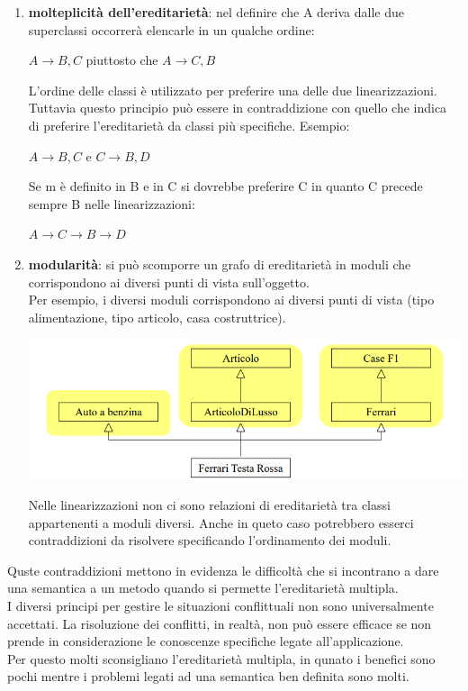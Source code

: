 \documentclass{article}
\begin{document}
	\begin{enumerate}
		\item \textbf{molteplicità dell'ereditarietà}: nel definire che A deriva dalle due superclassi occorrerà elencarle in un qualche ordine:
		\begin{center}
			$A \rightarrow B,C$ piuttosto che $A \rightarrow C,B$
		\end{center}
		L'ordine delle classi è utilizzato per preferire una delle due linearizzazioni. Tuttavia questo principio può essere in contraddizione con quello che indica di preferire l'ereditarietà da classi più specifiche. Esempio:
		\begin{center}
			$A \rightarrow B,C$ e $C \rightarrow B,D$
		\end{center}
		Se m è definito in B e in C si dovrebbe preferire C in quanto C precede sempre B nelle linearizzazioni:
		\begin{center}
			$A \rightarrow C \rightarrow B \rightarrow D$
		\end{center}
		\item \textbf{modularità}: si può scomporre un grafo di ereditarietà in moduli che corrispondono ai diversi punti di vista sull'oggetto. \\
		Per esempio, i diversi moduli corrispondono ai diversi punti di vista (tipo alimentazione, tipo articolo, casa costruttrice).
		\begin{center}
			\includegraphics[scale=0.5]{assets/ereditarieta_multipla_modularita.png}
		\end{center}
		Nelle linearizzazioni non ci sono relazioni di ereditarietà tra classi appartenenti a moduli diversi. Anche in queto caso potrebbero esserci contraddizioni da risolvere specificando l'ordinamento dei moduli.
	\end{enumerate}
	Quste contraddizioni mettono in evidenza le difficoltà che si incontrano a dare una semantica a un metodo quando si permette l'ereditarietà multipla.\\
	I diversi principi per gestire le situazioni conflittuali non sono universalmente accettati. La risoluzione dei conflitti, in realtà, non può essere efficace se non prende in considerazione le conoscenze specifiche legate all'applicazione. \\
	Per questo molti sconsigliano l'ereditarietà multipla, in qunato i benefici sono pochi mentre i problemi legati ad una semantica ben definita sono molti.
\end{document}
